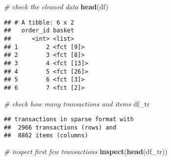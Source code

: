 \documentclass[]{article}
\newenvironment{Shaded}{\begin{snugshade}}{\end{snugshade}}
\newcommand{\CommentTok}[1]{\textcolor[rgb]{0.56,0.35,0.01}{\textit{#1}}}
\newcommand{\KeywordTok}[1]{\textcolor[rgb]{0.13,0.29,0.53}{\textbf{#1}}}
\newcommand{\NormalTok}[1]{#1}
\newcommand{\OperatorTok}[1]{\textcolor[rgb]{0.81,0.36,0.00}{\textbf{#1}}}
\newcommand{\StringTok}[1]{\textcolor[rgb]{0.31,0.60,0.02}{#1}}
\begin{document}
\begin{Shaded}
\begin{Highlighting}[]
\CommentTok{# check the cleaned data}
\KeywordTok{head}\NormalTok{(df)}
\end{Highlighting}
\end{Shaded}

\begin{verbatim}
## # A tibble: 6 x 2
##   order_id basket    
##      <int> <list>    
## 1        2 <fct [9]> 
## 2        3 <fct [8]> 
## 3        4 <fct [13]>
## 4        5 <fct [26]>
## 5        6 <fct [3]> 
## 6        7 <fct [2]>
\end{verbatim}

\begin{Shaded}
\end{Shaded}

\begin{Shaded}
\begin{Highlighting}[]
\CommentTok{# check how many transactions and items}
\NormalTok{df_tr}
\end{Highlighting}
\end{Shaded}

\begin{verbatim}
## transactions in sparse format with
##  2966 transactions (rows) and
##  8862 items (columns)
\end{verbatim}

\begin{Shaded}
\begin{Highlighting}[]
\CommentTok{# inspect first few transactions}
\KeywordTok{inspect}\NormalTok{(}\KeywordTok{head}\NormalTok{(df_tr))}
\end{Highlighting}
\end{Shaded}
\end{document}
